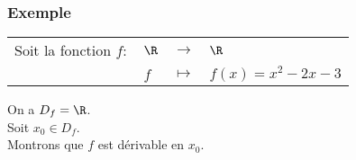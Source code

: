 \newpage

\subsubsection{Exemple }

\begin{tabular}{llll}
Soit la fonction $f :$ & $\R$ & $\longrightarrow$ & $\R$ \\
& $f$ & $\longmapsto$ & $f(x) = x^2 - 2x - 3$ \\
\end{tabular}

On a $D_f = \R$. \\

Soit $x_0 \in D_f$. \\

Montrons que $f$ est dérivable en $x_0$. \\

